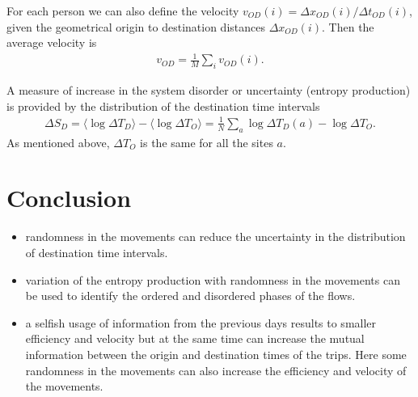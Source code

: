 \documentclass[aps,preprint]{revtex4-1}
\begin{document}
For each person we can also define the velocity $v_{OD}(i)=\Delta x_{OD}(i)/\Delta t_{OD}(i)$, given the geometrical origin to destination distances $\Delta x_{OD}(i)$. Then the average velocity is
\begin{align}
v_{OD}=\frac{1}{M}\sum_{i} v_{OD}(i).
\end{align}


A measure of increase in the system disorder or uncertainty (entropy production) is provided by the distribution of the destination time intervals  
\begin{align}
\Delta S_D=\langle \log \Delta T_D \rangle-\langle \log \Delta T_O \rangle=\frac{1}{N}\sum_a \log \Delta T_D(a)-\log \Delta T_O.
\end{align}
As mentioned above, $\Delta T_O$ is the same for all the sites $a$.





\section{Conclusion}\label{S3}

\begin{itemize}

\item randomness in the movements can reduce the uncertainty in the distribution of destination time intervals.

\item variation of the entropy production with randomness in the movements can be used to identify the ordered and disordered phases of the flows.

\item a selfish usage of information from the previous days results to smaller efficiency and velocity but at the same time can increase the mutual information between the origin and destination times of the trips.  Here some randomness in the movements can also increase the efficiency and velocity of the movements.
 

\end{itemize}
\end{document}
